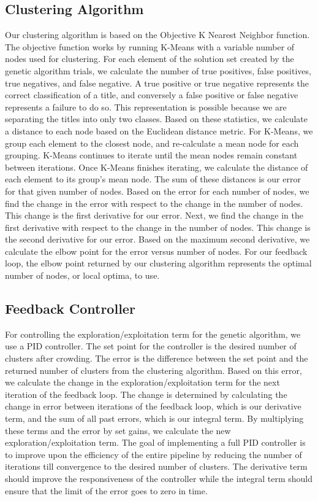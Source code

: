\documentclass{sig-alternate}
\begin{document}
\subsection{Clustering Algorithm}
Our clustering algorithm is based on the Objective K Nearest Neighbor function. The objective function works by running K-Means with a variable number of nodes used for clustering. For each element of the solution set created by the genetic algorithm trials, we calculate the number of true positives, false positives, true negatives, and false negative. A true positive or true negative represents the correct classification of a title, and conversely a false positive or false negative represents a failure to do so. This representation is possible because we are separating the titles into only two classes. Based on these statistics, we calculate a distance to each node based on the Euclidean distance metric. For K-Means, we group each element to the closest node, and re-calculate a mean node for each grouping. K-Means continues to iterate until the mean nodes remain constant between iterations. Once K-Means finishes iterating, we calculate the distance of each element to its group's mean node. The sum of these distances is our error for that given number of nodes.
Based on the error for each number of nodes, we find the change in the error with respect to the change in the number of nodes. This change is the first derivative for our error. Next, we find the change in the first derivative with respect to the change in the number of nodes. This change is the second derivative for our error. Based on the maximum second derivative, we calculate the elbow point for the error versus number of nodes. For our feedback loop, the elbow point returned by our clustering algorithm represents the optimal number of nodes, or local optima, to use.

\subsection{Feedback Controller}
For controlling the exploration/exploitation term for the genetic algorithm, we use a PID controller. The set point for the controller is the desired number of clusters after crowding. The error is the difference between the set point and the returned number of clusters from the clustering algorithm. Based on this error, we calculate the change in the exploration/exploitation term for the next iteration of the feedback loop. The change is determined by calculating the change in error between iterations of the feedback loop, which is our derivative term, and the sum of all past errors, which is our integral term. By multiplying these terms and the error by set gains, we calculate the new exploration/exploitation term. The goal of implementing a full PID controller is to improve upon the efficiency of the entire pipeline by reducing the number of iterations till convergence to the desired number of clusters. The derivative term should improve the responsiveness of the controller while the integral term should ensure that the limit of the error goes to zero in time.
\end{document}
